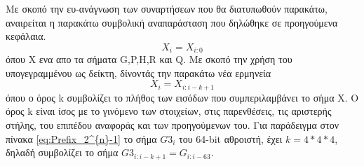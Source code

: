 Με σκοπό την ευ-ανάγνωση των συναρτήσεων που θα διατυπωθούν παρακάτω, αναιρείται 
η παρακάτω συμβολική αναπαράσταση που δηλώθηκε σε προηγούμενα κεφάλαια.
\begin{equation*}
    X_i = X_{i:0}
\end{equation*}
όπου X ενα απο τα σήματα G,P,H,R και Q.
Με σκοπό την χρήση του υπογεγραμμένου ως δείκτη, δίνοντάς την παρακάτω νέα ερμηνεία
\begin{equation*}
    X_i = X_{i:i-k+1}
\end{equation*}
όπου ο όρος k συμβολίζει το πλήθος των εισόδων που συμπεριλαμβάνει το σήμα X. Ο όρος k
είναι ίσος με το γινόμενο των στοιχείων, στις παρενθέσεις, τις αριστερής στήλης, 
του επιπέδου αναφοράς και των προηγούμενων του. Για παράδειγμα στον πίνακα \ref{eq:Prefix_2^{n}-1}
το σήμα $G3_i$ του 64-bit αθροιστή, έχει $k = 4*4*4$, δηλαδή συμβολίζει το σήμα
$G3_{i:i-k+1} = G_{i:i-63} $.


